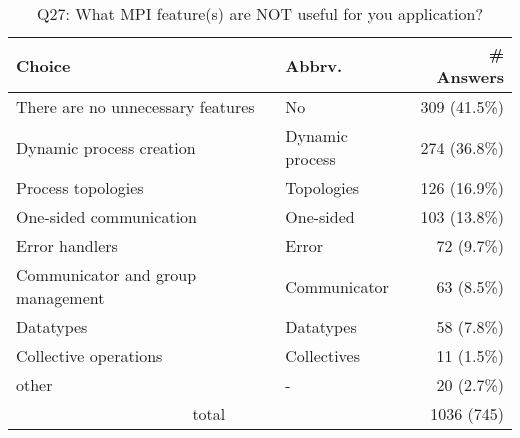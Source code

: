 \begin{table}[htb]%
\begin{center}%
\caption{Q27: What MPI feature(s) are NOT useful for you application?}%
\label{tab:Q27-ans}%
\begin{tabular}{l|l|r}%
\hline%
Choice & Abbrv. & \# Answers \\%
\hline%
There are no unnecessary features & No & 309 (41.5\%) \\%
Dynamic process creation & Dynamic process & 274 (36.8\%) \\%
Process topologies & Topologies & 126 (16.9\%) \\%
One-sided communication & One-sided & 103 (13.8\%) \\%
Error handlers & Error & 72 (9.7\%) \\%
Communicator and group management & Communicator & 63 (8.5\%) \\%
Datatypes & Datatypes & 58 (7.8\%) \\%
Collective operations & Collectives & 11 (1.5\%) \\%
other & - & 20 (2.7\%) \\%
\hline%
\multicolumn{2}{c}{total} & 1036 (745)\\%
\hline%
\end{tabular}%
\end{center}%
\end{table}%
